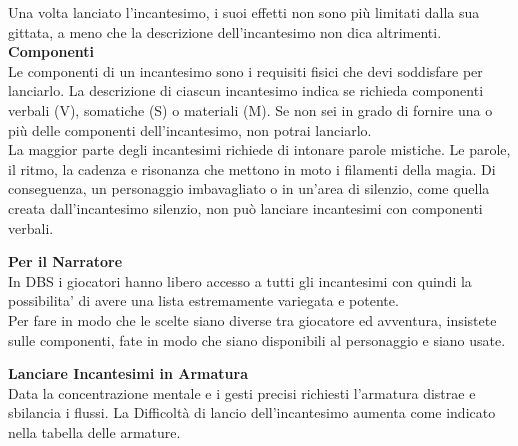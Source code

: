 Una volta lanciato l'incantesimo, i suoi effetti non sono più limitati dalla sua gittata, a meno che la descrizione  dell'incantesimo non dica altrimenti.\\

\textbf{Componenti}\\
Le componenti di un incantesimo sono i requisiti fisici  che devi soddisfare per lanciarlo. La descrizione di  ciascun incantesimo indica se richieda componenti  verbali (V), somatiche (S) o materiali (M). Se non sei in  grado di fornire una o più delle componenti  dell'incantesimo, non potrai lanciarlo.\\
La maggior parte degli incantesimi richiede di intonare parole mistiche. Le parole, il ritmo, la cadenza e risonanza che mettono in moto i filamenti della magia. Di conseguenza, un personaggio imbavagliato o in un'area di silenzio, come quella creata dall'incantesimo silenzio, non può lanciare incantesimi con componenti verbali.\\
\begin{note}\textbf{Per il Narratore}\\
In DBS i giocatori hanno libero accesso a tutti gli incantesimi con quindi la possibilita' di avere una lista estremamente variegata e potente.\\
Per fare in modo che le scelte siano diverse tra giocatore ed avventura, insistete sulle componenti, fate in modo che siano disponibili al personaggio e siano usate.
\end{note}
\medskip

\textbf{Lanciare Incantesimi in Armatura}\\
Data la concentrazione mentale e i gesti precisi richiesti l'armatura distrae e sbilancia i flussi. La Difficoltà di lancio dell'incantesimo aumenta come indicato nella tabella delle armature.\\

